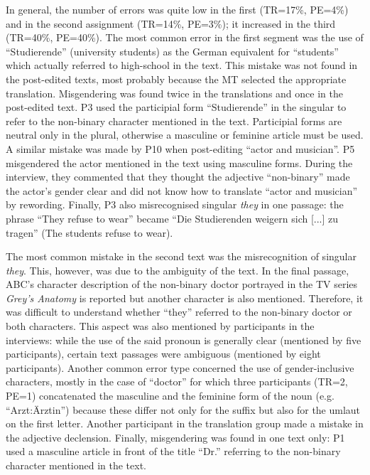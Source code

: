 In general, the number of errors was quite low in the first (TR=17\%, PE=4\%) and in the second assignment (TR=14\%, PE=3\%); it increased in the third (TR=40\%, PE=40\%). The most common error in the first segment was the use of ``Studierende'' (university students) as the German equivalent for ``students'' which actually referred to high-school in the text. This mistake was not found in the post-edited texts, most probably because the MT selected the appropriate translation. Misgendering was found twice in the translations and once in the post-edited text. P3 used the participial form ``Studierende'' in the singular to refer to the non-binary character mentioned in the text. Participial forms are neutral only in the plural, otherwise a masculine or feminine article must be used. A similar mistake was made by P10 when post-editing ``actor and musician''. P5 misgendered the actor mentioned in the text using masculine forms. During the interview, they commented that they thought the adjective ``non-binary'' made the actor's gender clear and did not know how to translate ``actor and musician'' by rewording. Finally, P3 also misrecognised singular \textit{they} in one passage: the phrase ``They refuse to wear'' became ``Die Studierenden weigern sich [...] zu tragen'' (The students refuse to wear). 

The most common mistake in the second text was the misrecognition of singular \textit{they}. This, however, was due to the ambiguity of the text. In the final passage, ABC's character description of the non-binary doctor portrayed in the TV series \textit{Grey's Anatomy} is reported but another character is also mentioned. Therefore, it was difficult to understand whether ``they'' referred to the non-binary doctor or both characters. This aspect was also mentioned by participants in the interviews: while the use of the said pronoun is generally clear (mentioned by five participants), certain text passages were ambiguous (mentioned by eight participants). Another common error type concerned the use of gender-inclusive characters, mostly in the case of ``doctor'' for which three participants (TR=2, PE=1) concatenated the masculine and the feminine form of the noun (e.g. ``Arzt:Ärztin'') because these differ not only for the suffix but also for the umlaut on the first letter. Another participant in the translation group made a mistake in the adjective declension. Finally, misgendering was found in one text only: P1 used a masculine article in front of the title ``Dr.'' referring to the non-binary character mentioned in the text.

